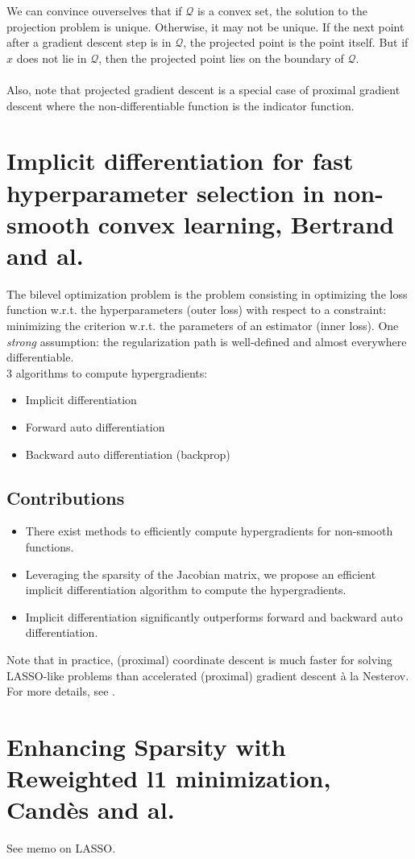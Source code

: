 \documentclass[a4paper,10pt]{article}
\theoremstyle{definition}
\begin{document}
We can convince ouverselves that if $\mathcal{Q}$ is a convex set, the solution to the projection problem is unique. Otherwise, it may
not be unique. If the next point after a gradient descent step is in $\mathcal{Q}$, the projected point is the point itself. But if $x$
does not lie in $\mathcal{Q}$, then the projected point lies on the boundary of $\mathcal{Q}$.
\\
\\
Also, note that projected gradient descent is a special case of proximal gradient descent where the
non-differentiable function is the indicator function.


\section{Implicit differentiation for fast hyperparameter selection in non-smooth convex learning, Bertrand and al.}

The bilevel optimization problem is the problem consisting in optimizing the loss function w.r.t. the hyperparameters (outer loss)
with respect to a constraint: minimizing the criterion w.r.t. the parameters  of an estimator (inner loss).
One \textit{strong} assumption: the regularization path is well-defined and almost everywhere differentiable.\\

3 algorithms to compute hypergradients:
\begin{itemize}
    \item Implicit differentiation
    \item Forward auto differentiation
    \item Backward auto differentiation (backprop)
\end{itemize}

\subsection*{Contributions}

\begin{itemize}
    \item There exist methods to efficiently compute hypergradients for non-smooth functions.
    \item Leveraging the sparsity of the Jacobian matrix, we propose an efficient implicit differentiation algorithm to compute the hypergradients.
    \item Implicit differentiation significantly outperforms forward and backward auto differentiation.
\end{itemize}

\vskip 0.1in

Note that in practice, (proximal) coordinate descent is much faster for solving LASSO-like problems than accelerated (proximal) gradient descent à la Nesterov.
For more details, see \cite{Bertrand_Massias_Anderson}.

\section{Enhancing Sparsity with Reweighted l1 minimization, Candès and al.}

See memo on LASSO.


\newpage


\end{document}

